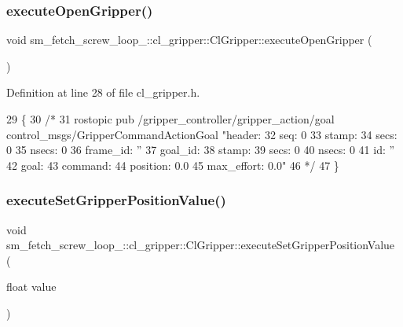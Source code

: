 \subsubsection{\texorpdfstring{execute\+Open\+Gripper()}{executeOpenGripper()}}
{\footnotesize\ttfamily void sm\+\_\+fetch\+\_\+screw\+\_\+loop\+\_\+::cl\+\_\+gripper\+::\+Cl\+Gripper\+::execute\+Open\+Gripper (\begin{DoxyParamCaption}{ }\end{DoxyParamCaption})\hspace{0.3cm}{\ttfamily [inline]}}



Definition at line 28 of file cl\+\_\+gripper.\+h.


\begin{DoxyCode}
29   \{
30     \textcolor{comment}{/*}
31 \textcolor{comment}{  rostopic pub /gripper\_controller/gripper\_action/goal control\_msgs/GripperCommandActionGoal "header:}
32 \textcolor{comment}{  seq: 0}
33 \textcolor{comment}{  stamp:}
34 \textcolor{comment}{    secs: 0}
35 \textcolor{comment}{    nsecs: 0}
36 \textcolor{comment}{  frame\_id: ''}
37 \textcolor{comment}{goal\_id:}
38 \textcolor{comment}{  stamp:}
39 \textcolor{comment}{    secs: 0}
40 \textcolor{comment}{    nsecs: 0}
41 \textcolor{comment}{  id: ''}
42 \textcolor{comment}{goal:}
43 \textcolor{comment}{  command:}
44 \textcolor{comment}{    position: 0.0}
45 \textcolor{comment}{    max\_effort: 0.0"}
46 \textcolor{comment}{    */}
47   \}
\end{DoxyCode}
\mbox{\label{classsm__fetch__screw__loop__1_1_1cl__gripper_1_1ClGripper_a94665e542f57bc46fbe401707e5a0064}} 
\subsubsection{\texorpdfstring{execute\+Set\+Gripper\+Position\+Value()}{executeSetGripperPositionValue()}}
{\footnotesize\ttfamily void sm\+\_\+fetch\+\_\+screw\+\_\+loop\+\_\+::cl\+\_\+gripper\+::\+Cl\+Gripper\+::execute\+Set\+Gripper\+Position\+Value (\begin{DoxyParamCaption}\item[{float}]{value }\end{DoxyParamCaption})\hspace{0.3cm}{\ttfamily [inline]}}



